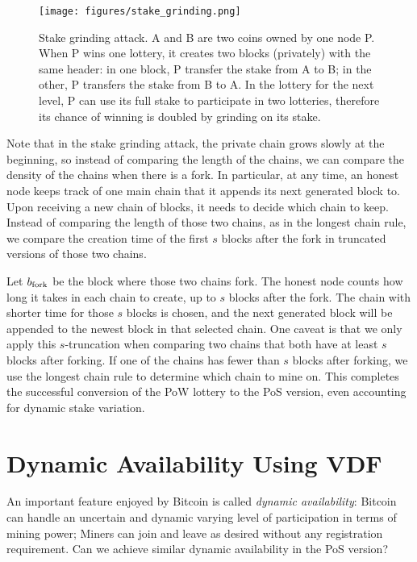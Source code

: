 \documentclass{article}
\begin{document}
\begin{figure}
    \centering
\texttt{[image: figures/stake\_grinding.png]}
\caption{Stake grinding attack. A and B are two coins owned by one node P. When P wins one lottery, it creates two blocks (privately) with the same header: in one block, P transfer the stake from A to B; in the other, P transfers the stake from B to A. In the lottery for the next level, P can use its full stake to participate in two lotteries, therefore its chance of winning is doubled by grinding on its stake.}
\label{fig:grinding}
\end{figure}

Note that in the stake grinding attack, the private chain grows slowly at the beginning, so instead of comparing the length of the chains, we can compare the density of the chains when there is a fork. In particular, at any time, an honest node keeps track of one main chain that it appends its next generated block to. Upon receiving a new chain of blocks, it needs to decide which chain to keep. Instead of comparing the length of those two chains, as in the longest chain rule, we compare the creation time of the first $s$ blocks after the fork in truncated versions of those two chains.

Let $b_{\rm fork}$ be the block where those two chains fork. The honest node counts how long it takes in each chain to create, up to $s$ blocks after the fork.
The chain with shorter time for those $s$ blocks is chosen, and the next generated block will be appended to the newest block in that selected chain. One caveat is that we only apply this $s$-truncation when comparing two chains that both have at least $s$ blocks after forking. If one of the chains has fewer than $s$ blocks after forking, we use the longest chain rule to determine which chain to mine on. This completes the successful conversion of the PoW lottery to the PoS version, even accounting for dynamic stake variation.   

\section*{Dynamic Availability Using VDF}
An important feature enjoyed by {\sf Bitcoin} is called {\em dynamic availability}: {\sf Bitcoin} can handle an uncertain and dynamic varying level of participation in terms of mining power; Miners can join and leave as desired without any registration requirement. Can we achieve similar dynamic availability in the PoS version?
\end{document}
